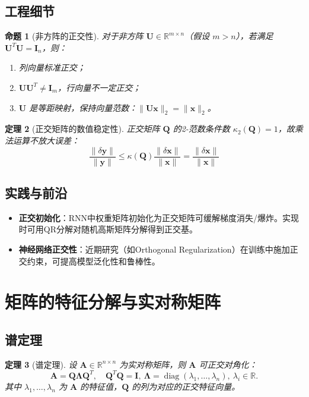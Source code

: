 \documentclass[UTF8, 10pt]{ctexart}
\newtheorem{theorem}{定理}[section]
\newtheorem{proposition}[theorem]{命题}
\newcommand{\R}{\mathbb{R}}
\newcommand{\diag}{\operatorname{diag}}
\begin{document}
\subsection{工程细节}
\begin{proposition}[非方阵的正交性]
对于非方阵 $\bm{U} \in \R^{m \times n}$（假设 $m > n$），若满足 $\bm{U}^T \bm{U} = \bm{I}_n$，则：
\begin{enumerate}
    \item 列向量标准正交；
    \item $\bm{U} \bm{U}^T \neq \bm{I}_m$，行向量不一定正交；
    \item $\bm{U}$ 是等距映射，保持向量范数：$\|\bm{U}\bm{x}\|_2 = \|\bm{x}\|_2$。
\end{enumerate}
\end{proposition}

\begin{theorem}[正交矩阵的数值稳定性]
正交矩阵 $\bm{Q}$ 的2-范数条件数 $\kappa_2(\bm{Q}) = 1$，故乘法运算不放大误差：
\[
\frac{\|\delta \bm{y}\|}{\|\bm{y}\|} \le \kappa(\bm{Q}) \frac{\|\delta \bm{x}\|}{\|\bm{x}\|} = \frac{\|\delta \bm{x}\|}{\|\bm{x}\|}
\]
\end{theorem}

\subsection{实践与前沿}
\begin{itemize}
    \item \textbf{正交初始化}：RNN中权重矩阵初始化为正交矩阵可缓解梯度消失/爆炸。实现时可用QR分解对随机高斯矩阵分解得到正交基。
    \item \textbf{神经网络正交性}：近期研究（如Orthogonal Regularization）在训练中施加正交约束，可提高模型泛化性和鲁棒性。
\end{itemize}

\section{矩阵的特征分解与实对称矩阵}
\subsection{谱定理}
\begin{theorem}[谱定理]
设 $\bm{A} \in \R^{n \times n}$ 为实对称矩阵，则 $\bm{A}$ 可正交对角化：
\[
\bm{A} = \bm{Q} \bm{\Lambda} \bm{Q}^T,\quad \bm{Q}^T\bm{Q}=\bm{I},\ \bm{\Lambda}=\diag(\lambda_1,\dots,\lambda_n),\ \lambda_i \in \R.
\]
其中 $\lambda_1, \ldots, \lambda_n$ 为 $\bm{A}$ 的特征值，$\bm{Q}$ 的列为对应的正交特征向量。
\end{theorem}
\end{document}
